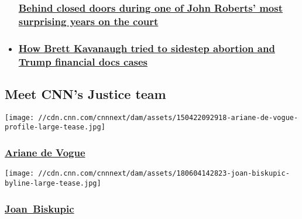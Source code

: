 \begin{itemize}
{  \subsubsection{\texorpdfstring{\href{/2020/07/27/politics/john-roberts-supreme-court-liberals-daca-second-amendment/index.html}{Behind
  closed doors during one of John Roberts' most surprising years on the
  court}}{Behind closed doors during one of John Roberts' most surprising years on the court}}\label{behind-closed-doors-during-one-of-john-roberts-most-surprising-years-on-the-court}}
\item
  \hypertarget{how-brett-kavanaugh-tried-to-sidestep-abortion-and-trump-financial-docs-cases}{%
  \subsubsection{\texorpdfstring{\href{/2020/07/29/politics/brett-kavanaugh-supreme-court-abortion-trump-documents/index.html}{How
  Brett Kavanaugh tried to sidestep abortion and Trump financial docs
  cases}}{How Brett Kavanaugh tried to sidestep abortion and Trump financial docs cases}}\label{how-brett-kavanaugh-tried-to-sidestep-abortion-and-trump-financial-docs-cases}}
\end{itemize}

\hypertarget{meet-cnns-justice-team}{%
\subsection{Meet CNN's Justice team}\label{meet-cnns-justice-team}}

\href{/profiles/ariane-de-vogue-profile}{}

\texttt{[image: //cdn.cnn.com/cnnnext/dam/assets/150422092918-ariane-de-vogue-profile-large-tease.jpg]}

\hypertarget{ariane-de-vogue}{%
\subsubsection{\texorpdfstring{\href{/profiles/ariane-de-vogue-profile}{Ariane
de Vogue}}{Ariane de Vogue}}\label{ariane-de-vogue}}

\href{/profiles/joan-biskupic}{}

\texttt{[image: //cdn.cnn.com/cnnnext/dam/assets/180604142823-joan-biskupic-byline-large-tease.jpg]}

\hypertarget{joan-biskupic}{%
\subsubsection{\texorpdfstring{\href{/profiles/joan-biskupic}{Joan~Biskupic}}{Joan~Biskupic}}\label{joan-biskupic}}

